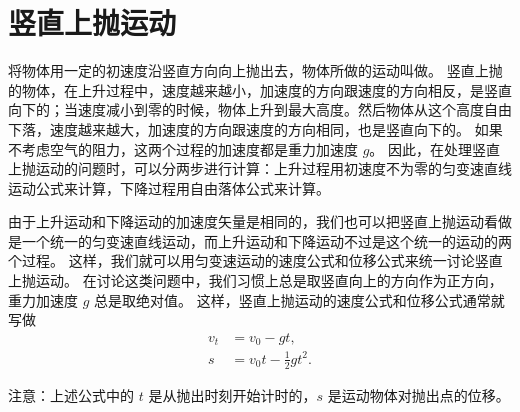\section{竖直上抛运动}
将物体用一定的初速度沿竖直方向向上抛出去，物体所做的运动叫做。
竖直上抛的物体，在上升过程中，速度越来越小，加速度的方向跟速度的方向相反，是竖直向下的；当速度减小到零的时候，物体上升到最大高度。然后物体从这个高度自由下落，速度越来越大，加速度的方向跟速度的方向相同，也是竖直向下的。
如果不考虑空气的阻力，这两个过程的加速度都是重力加速度 $g$。
因此，在处理竖直上抛运动的问题时，可以分两步进行计算：上升过程用初速度不为零的匀变速直线运动公式来计算，下降过程用自由落体公式来计算。

由于上升运动和下降运动的加速度矢量是相同的，我们也可以把竖直上抛运动看做是一个统一的匀变速直线运动，而上升运动和下降运动不过是这个统一的运动的两个过程。
这样，我们就可以用匀变速运动的速度公式和位移公式来统一讨论竖直上抛运动。
在讨论这类问题中，我们习惯上总是取竖直向上的方向作为正方向，重力加速度 $g$ 总是取绝对值。
这样，竖直上抛运动的速度公式和位移公式通常就写做
\[\begin{split}
v_t&=v_0-gt,\\
s&=v_0 t-\frac{1}{2}gt^2.
\end{split}\]

注意：上述公式中的 $t$ 是从抛出时刻开始计时的，$s$ 是运动物体对抛出点的位移。

